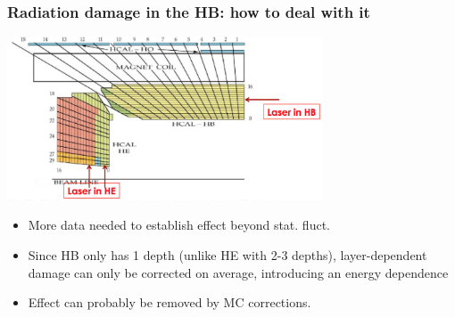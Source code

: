 \documentclass[bigger]{beamer}
\begin{document}
\begin{frame}
\frametitle{Radiation damage in the HB: how to deal with it}
\label{sec-2-2-5}
\label{sec-2-2-5-1}

\centering
\includegraphics[width=0.7\textwidth]{fig/laserInsert.png}
\begin{itemize}

\item More data needed to establish effect beyond stat. fluct.
\label{sec-2-2-5-2}%

\item Since HB only has 1 depth (unlike HE with 2-3 depths), layer-dependent damage can only be corrected on average, introducing an energy dependence
\label{sec-2-2-5-3}%

\item Effect can probably be removed by MC corrections.
\label{sec-2-2-5-4}%
\end{itemize} %
\end{frame}
\end{document}
